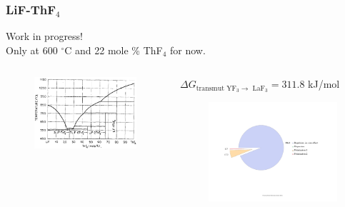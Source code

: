 \documentclass{beamer}
\begin{document}
\begin{frame}
    \frametitle{LiF-ThF$_4$}
    Work in progress!\\
    Only at 600 $^{\circ}$C and 22 mole \% ThF$_4$ for now.
    \vspace{0.5cm}
    \begin{columns}
        \begin{column}{5cm}
            \begin{figure}
                \includegraphics[width=\textwidth]{LiFThF4ddp.png}
            \end{figure}
        \end{column}
        \begin{column}{7cm}
            $\Delta G_{\text{transmut YF}_3 \rightarrow\text{ LaF}_3} = 311.8$ kJ/mol
            \begin{figure}
                \includegraphics[width=\textwidth]{LiFTF4dGchart}

\end{figure}
\end{column}
\end{columns}
\end{frame}
\end{document}
